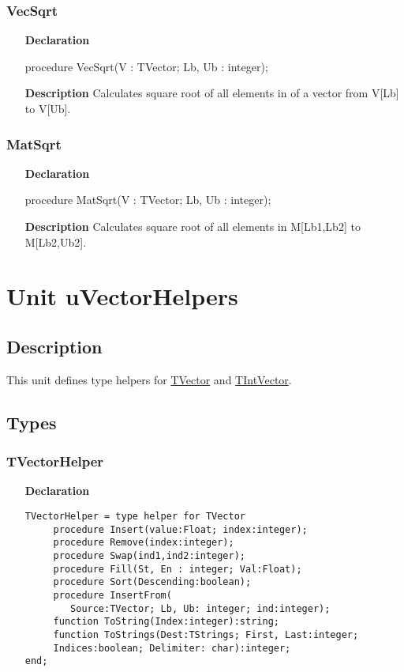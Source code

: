 \documentclass[12pt,a4paper,oneside]{report}
\newcommand{\lmath}[1]{   %
	\marginpar{\vspace{#1} 
		\begin{flushright}
			LMath
	\end{flushright} }
}
\newcommand{\declarationitem}[1]{\textbf{#1}}
\newcommand{\descriptiontitle}[1]{\textbf{#1}}
\begin{document}
\subsubsection{VecSqrt}
\label{uvecfunc:VecSqrt}
\begin{itemize}
	\item[\declarationitem{Declaration}\hfill]
	\begin{flushleft}
procedure VecSqrt(V : TVector; Lb, Ub : integer); 
	\end{flushleft}
	\item[\descriptiontitle{Description}\hfill]
		Calculates square root of all elements in of a vector from V[Lb] to V[Ub].
\end{itemize}
\subsubsection{MatSqrt}
\label{uvecfunc:MatSqrt}
\begin{itemize}
	\item[\declarationitem{Declaration}\hfill]
	\begin{flushleft}
		procedure MatSqrt(V : TVector; Lb, Ub : integer); 
	\end{flushleft}
	\item[\descriptiontitle{Description}\hfill]
		Calculates square root of all elements in M[Lb1,Lb2] to M[Lb2,Ub2].
\end{itemize}

\section{Unit uVectorHelpers}\label{sec:unit-uvectorhelpers}
\lmath{-28pt}
\subsection{Description}
This unit defines type helpers for \hyperref[utypes-TVector]{TVector} and \hyperref[utypes-TIntVector]{TIntVector}.
\subsection{Types}
\subsubsection{TVectorHelper}
\begin{itemize}
\item[\declarationitem{Declaration}\hfill]
	\begin{verbatim}
TVectorHelper = type helper for TVector
     procedure Insert(value:Float; index:integer);
     procedure Remove(index:integer);
     procedure Swap(ind1,ind2:integer);
     procedure Fill(St, En : integer; Val:Float);
     procedure Sort(Descending:boolean);
     procedure InsertFrom(
     	Source:TVector; Lb, Ub: integer; ind:integer);
     function ToString(Index:integer):string;
     function ToStrings(Dest:TStrings; First, Last:integer;
     Indices:boolean; Delimiter: char):integer;
end;
	\end{verbatim}
\end{itemize}
\end{document}
